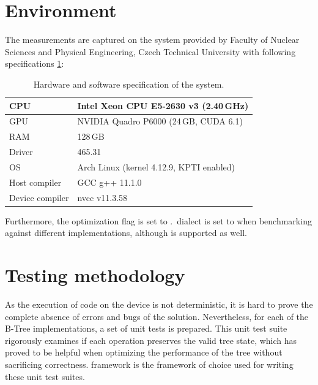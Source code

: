\section{Environment}

The measurements are captured on the  system provided by Faculty of Nuclear Sciences and Physical Engineering, Czech Technical University with following specifications \ref{table:env-gp1}:

\begin{table}[H]
  \centering
  \begin{tabular}{ | l | l | }
    \hline
    CPU             & Intel Xeon CPU E5-2630 v3 (2.40\,GHz)    \\
    \hline
    GPU             & NVIDIA Quadro P6000 (24\,GB, CUDA 6.1)   \\
    \hline
    RAM             & 128\,GB                                  \\
    \hline
    Driver          & 465.31                                   \\
    \hline
    OS              & Arch Linux (kernel 4.12.9, KPTI enabled) \\
    \hline
    Host compiler   & GCC g++ 11.1.0                           \\
    \hline
    Device compiler & nvcc v11.3.58                            \\
    \hline
  \end{tabular}
  \caption{Hardware and software specification of the  system.}
  \label{table:env-gp1}
\end{table}

Furthermore, the optimization flag is set to . \CC\,dialect is set to  when benchmarking against different implementations, although  is supported as well.

\section{Testing methodology}

As the execution of code on the device is not deterministic, it is hard to prove the complete absence of errors and bugs of the solution. Nevertheless, for each of the B-Tree implementations, a set of unit tests is prepared. This unit test suite rigorously examines if each operation preserves the valid tree state, which has proved to be helpful when optimizing the performance of the tree without sacrificing correctness.  framework \cite{gtest} is the framework of choice used for writing these unit test suites.

